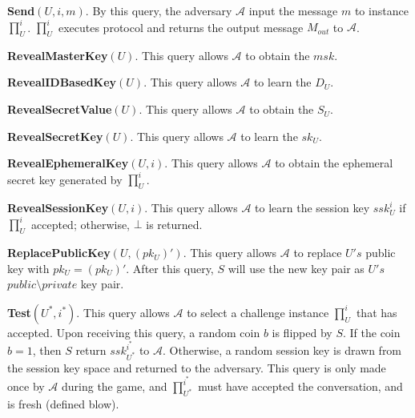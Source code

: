 \documentclass[final,1p,times,twocolumn]{elsarticle}
\begin{document}
\vspace{0.2cm}

{\bf Send$(U,i,m)$}. By this query, the adversary $\mathcal{A}$ input the message $m$ to instance $\prod_{U}^{i}$. $\prod_{U}^{i}$ executes protocol and returns the output message $M_{out}$ to $\mathcal{A}$.

\vspace{0.2cm}

{\bf RevealMasterKey$(U)$}. This query allows $\mathcal{A}$ to obtain the $msk$.

\vspace{0.2cm}

{\bf RevealIDBasedKey$(U)$}. This query allows $\mathcal{A}$ to learn the $D_{U}$.

\vspace{0.2cm}

{\bf RevealSecretValue$(U)$}. This query allows $\mathcal{A}$ to obtain the $S_{U}$.

\vspace{0.2cm}

{\bf RevealSecretKey$(U)$}. This query allows $\mathcal{A}$ to learn the $sk_{U}$.

\vspace{0.2cm}

{\bf RevealEphemeralKey$(U,i)$}. This query allows $\mathcal{A}$ to obtain the ephemeral secret key generated by $\prod_{U}^{i}$.

\vspace{0.2cm}

{\bf RevealSessionKey$(U,i)$}. This query allows $\mathcal{A}$ to learn the session key $ssk_{U}^{i}$ if $\prod_{U}^{i}$ accepted; otherwise, $\bot$ is returned.

\vspace{0.2cm}

{\bf ReplacePublicKey$(U,(pk_{U})')$}. This query allows $\mathcal{A}$ to replace $U's$ public key with $pk_{U}= (pk_{U})'$. After this query, $S$ will use the new key pair as $U's$ $public\setminus private$ key pair.

\vspace{0.2cm}

{\bf Test$(U^{*},i^{*})$}. This query allows $\mathcal{A}$ to select a challenge instance $\prod_{U}^{i}$ that has accepted. Upon receiving this query, a random coin $b$ is flipped by $S$. If the coin $b=1$, then $S$ return $ssk_{U^{\ast}}^{i^{\ast}}$ to $\mathcal{A}$. Otherwise, a random session key is drawn from the session key space and returned to the adversary. This query is only made once by $\mathcal{A}$ during the game, and $\prod_{U^{\ast}}^{i^{\ast}}$ must have accepted the conversation, and is fresh (defined blow).
\end{document}
